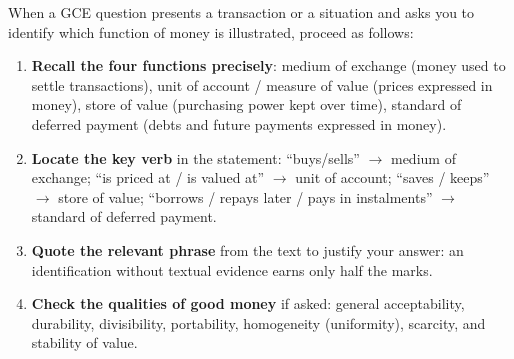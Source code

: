 \documentclass[11pt]{article}
\newcommand{\cle}[1]{{\popxbold\color{popdark}#1}}
\begin{document}
\begin{methode}
When a GCE question presents a transaction or a situation and asks you to identify which function of money is illustrated, proceed as follows:
\begin{enumerate}
\item \textbf{Recall the four functions precisely}: \cle{medium of exchange} (money used to settle transactions), \cle{unit of account / measure of value} (prices expressed in money), \cle{store of value} (purchasing power kept over time), \cle{standard of deferred payment} (debts and future payments expressed in money).
\item \textbf{Locate the key verb} in the statement: ``buys/sells'' $\rightarrow$ medium of exchange; ``is priced at / is valued at'' $\rightarrow$ unit of account; ``saves / keeps'' $\rightarrow$ store of value; ``borrows / repays later / pays in instalments'' $\rightarrow$ standard of deferred payment.
\item \textbf{Quote the relevant phrase} from the text to justify your answer: an identification without textual evidence earns only half the marks.
\item \textbf{Check the qualities of good money} if asked: general acceptability, durability, divisibility, portability, homogeneity (uniformity), scarcity, and stability of value.
\end{enumerate}
\end{methode}
\end{document}
